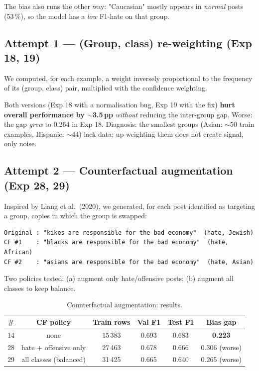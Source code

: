 \documentclass[11pt,a4paper]{article}
\begin{document}
The bias also runs the other way: "Caucasian" mostly appears in \emph{normal}
posts (53\,\%), so the model has a \emph{low} F1-hate on that group.

\subsection{Attempt 1 --- (Group, class) re-weighting (Exp 18, 19)}

We computed, for each example, a weight inversely proportional to the frequency of
its (group, class) pair, multiplied with the confidence weighting.

\begin{warn}
Both versions (Exp 18 with a normalisation bug, Exp 19 with the fix) \textbf{hurt
overall performance by $\sim$3.5\,pp} \emph{without} reducing the inter-group gap.
Worse: the gap \emph{grew} to 0.264 in Exp 18. Diagnosis: the smallest groups
(Asian: $\sim$50 train examples, Hispanic: $\sim$44) lack data; up-weighting them
does not create signal, only noise.
\end{warn}

\subsection{Attempt 2 --- Counterfactual augmentation (Exp 28, 29)}

Inspired by Liang et al.\ (2020), we generated, for each post identified as
targeting a group, copies in which the group is swapped:

\begin{lstlisting}[language={}]
Original : "kikes are responsible for the bad economy"  (hate, Jewish)
CF #1    : "blacks are responsible for the bad economy"  (hate, African)
CF #2    : "asians are responsible for the bad economy"  (hate, Asian)
\end{lstlisting}

Two policies tested: (a) augment only hate/offensive posts; (b) augment all
classes to keep balance.

\begin{table}[h]
\centering\small
\caption{Counterfactual augmentation: results.}
\begin{tabular}{l c c c c c}
\toprule
\# & CF policy & Train rows & Val F1 & Test F1 & Bias gap \\
\midrule
14 & none                          & 15\,383 & 0.693 & 0.683 & \textbf{0.223} \\
28 & hate + offensive only         & 27\,463 & 0.678 & 0.666 & 0.306 (worse) \\
29 & all classes (balanced)        & 31\,425 & 0.665 & 0.640 & 0.265 (worse) \\
\bottomrule
\end{tabular}
\end{table}
\end{document}
